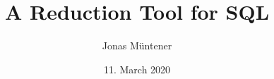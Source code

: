 \documentclass[]{article}
\title{A Reduction Tool for SQL}
\author{Jonas Müntener}
\date{11. March 2020}
\begin{document}
\maketitle

\begin{abstract}

\end{abstract}





\end{document}
